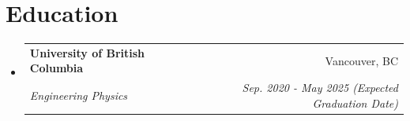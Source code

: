 \documentclass[letterpaper,11pt]{article}
\makeatletter
\newcommand{\resumeSubheading}[4]{
  \vspace{-2pt}\item
    \begin{tabular*}{0.97\textwidth}[t]{l@{\extracolsep{\fill}}r}
      \textbf{#1} & #2 \\
      \textit{\small#3} & \textit{\small #4} \\
    \end{tabular*}\vspace{-7pt}
}
\newcommand{\resumeSubHeadingListStart}{\begin{itemize}[leftmargin=0.15in, label={}]}
\newcommand{\resumeSubHeadingListEnd}{\end{itemize}}
\makeatother
\begin{document}
\section{Education}
  \resumeSubHeadingListStart
    \resumeSubheading
      {University of British Columbia}{Vancouver, BC}
      {Engineering Physics}{Sep. 2020 - May 2025 (Expected Graduation Date)}
  \resumeSubHeadingListEnd

\vspace{-3mm}

\end{document}
